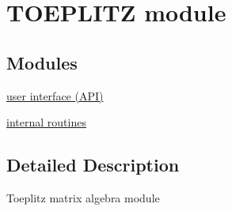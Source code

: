 \hypertarget{group__toeplitz}{\section{T\-O\-E\-P\-L\-I\-T\-Z module}
\label{group__toeplitz}
}
\subsection*{Modules}
\begin{DoxyCompactItemize}
\item 
\hyperlink{group__group1}{user interface (\-A\-P\-I)}
\item 
\hyperlink{group__group2}{internal routines}
\end{DoxyCompactItemize}


\subsection{Detailed Description}
Toeplitz matrix algebra module 
